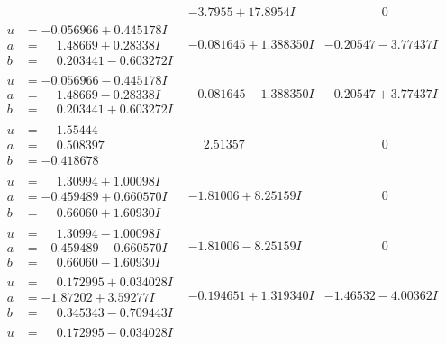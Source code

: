 \documentclass[1p]{elsarticle_modified}
\theoremstyle{definition}
\begin{document}
$$\begin{array}{c|c|c}
 & -3.7955 + 17.8954 I & \phantom{-0.000000 } 0 \\ \hline\begin{aligned}
u &= -0.056966 + 0.445178 I \\
a &= \phantom{-}1.48669 + 0.28338 I \\
b &= \phantom{-}0.203441 - 0.603272 I\end{aligned}
 & -0.081645 + 1.388350 I & -0.20547 - 3.77437 I \\ \hline\begin{aligned}
u &= -0.056966 - 0.445178 I \\
a &= \phantom{-}1.48669 - 0.28338 I \\
b &= \phantom{-}0.203441 + 0.603272 I\end{aligned}
 & -0.081645 - 1.388350 I & -0.20547 + 3.77437 I \\ \hline\begin{aligned}
u &= \phantom{-}1.55444\phantom{ +0.000000I} \\
a &= \phantom{-}0.508397\phantom{ +0.000000I} \\
b &= -0.418678\phantom{ +0.000000I}\end{aligned}
 & \phantom{-}2.51357\phantom{ +0.000000I} & \phantom{-0.000000 } 0 \\ \hline\begin{aligned}
u &= \phantom{-}1.30994 + 1.00098 I \\
a &= -0.459489 + 0.660570 I \\
b &= \phantom{-}0.66060 + 1.60930 I\end{aligned}
 & -1.81006 + 8.25159 I & \phantom{-0.000000 } 0 \\ \hline\begin{aligned}
u &= \phantom{-}1.30994 - 1.00098 I \\
a &= -0.459489 - 0.660570 I \\
b &= \phantom{-}0.66060 - 1.60930 I\end{aligned}
 & -1.81006 - 8.25159 I & \phantom{-0.000000 } 0 \\ \hline\begin{aligned}
u &= \phantom{-}0.172995 + 0.034028 I \\
a &= -1.87202 + 3.59277 I \\
b &= \phantom{-}0.345343 - 0.709443 I\end{aligned}
 & -0.194651 + 1.319340 I & -1.46532 - 4.00362 I \\ \hline\begin{aligned}
u &= \phantom{-}0.172995 - 0.034028 I \\

\end{aligned}
\end{array}$$
\end{document}
